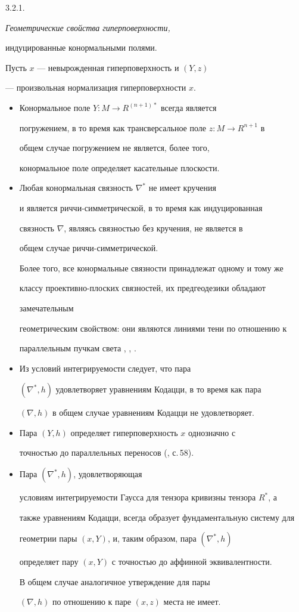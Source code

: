 3.2.1. {\it Геометрические свойства гиперповерхности,


индуцированные конормальными полями.}


Пусть $x$ --- невырожденная гиперповерхность и $(Y,z)$


--- произвольная нормализация гиперповерхности $x$.


\begin{itemize}


\item[(a)] Конормальное поле $Y: M \to R^{(n+1)*}$ всегда является


погружением, в то время как трансверсальное поле $z: M \to R^{n+1}$ в


общем случае погружением не является, более того,


конормальное поле определяет касательные плоскости.


\item[(b)] Любая конормальная связность $\nabla ^*$ не имеет кручения


и является риччи-симметрической, в то время как индуцированная


связность $\nabla$, являясь связностью без кручения, не является в


общем случае риччи-симметрической.


Более того, все конормальные связности принадлежат одному и тому же


классу проективно-плоских связностей, их предгеодезики обладают


замечательным


геометрическим свойством: они являются линиями тени по отношению к


параллельным пучкам света \cite{SCHI}, \cite{LAU}, \cite{SIM-1}.


\item[(c)] Из условий интегрируемости следует, что пара


$(\nabla ^*, h)$ удовлетворяет уравнениям Кодацци, в то время как пара


$(\nabla , h)$ в общем случае уравнениям Кодацци не удовлетворяет.


\item[(d)] Пара $(Y,h)$ определяет гиперповерхность $x$ однозначно с


точностью до параллельных переносов (\cite{NOM-SA}, с.\,58).


\item[(e)] Пара $(\nabla ^*, h)$, удовлетворяющая


условиям интегрируемости Гаусса для тензора кривизны тензора $R^*$, а


также уравнениям Кодацци, всегда образует фундаментальную систему для


геометрии пары $(x,Y)$, и, таким образом, пара $(\nabla ^*, h)$


определяет пару $(x,Y)$ с точностью до аффинной эквивалентности.


В общем случае аналогичное утверждение для пары


$(\nabla ,h)$ по отношению к паре $(x,z)$ места не имеет.


\end{itemize}





